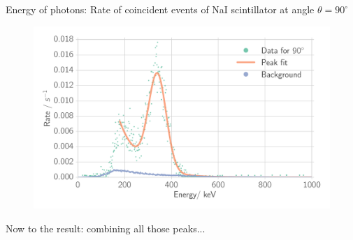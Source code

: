 \documentclass[xcolor=x11names,compress]{beamer}
\renewcommand{\(}{\begin{columns}}
\renewcommand{\)}{\end{columns}}
\newcommand{\<}[1]{\begin{column}{#1}}
\renewcommand{\>}{\end{column}}
\begin{document}
\begin{frame}[t]{Energy of photons: Rate of coincident events of NaI scintillator at angle $\theta = 90^\circ$}
\begin{figure}[htpb]
    \centering
    \includegraphics[width=1.0\linewidth]{../analysis/figures/coin_na_90}
    \label{fig:coin_na_30}
\end{figure}
\end{frame}

\begin{frame}[c]{}
    Now to the result: combining all those peaks...
\end{frame}
\end{document}
